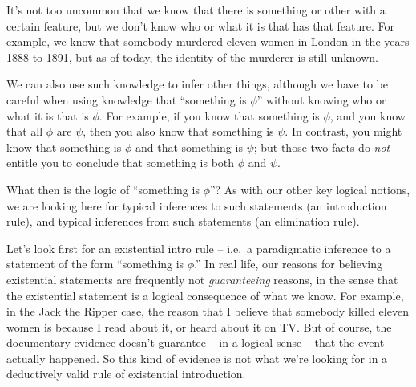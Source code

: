 It's not too uncommon that we know that there is something or other
with a certain feature, but we don't know who or what it is that has
that feature.  For example, we know that somebody murdered eleven
women in London in the years 1888 to 1891, but as of today, the
identity of the murderer is still unknown.

We can also use such knowledge to infer other things, although we have
to be careful when using knowledge that ``something is $\phi$''
without knowing who or what it is that is $\phi$.  For example, if you
know that something is $\phi$, and you know that all $\phi$ are
$\psi$, then you also know that something is $\psi$.  In contrast, you
might know that something is $\phi$ and that something is $\psi$; but
those two facts do {\it not} entitle you to conclude that something is
both $\phi$ and $\psi$.

What then is the logic of ``something is $\phi$''?  As with our other
key logical notions, we are looking here for typical inferences to
such statements (an introduction rule), and typical inferences
from such statements (an elimination rule).

Let's look first for an existential intro rule -- i.e.\ a paradigmatic
inference to a statement of the form ``something is $\phi$.''  In real
life, our reasons for believing existential statements are frequently
not {\it guaranteeing} reasons, in the sense that the existential
statement is a logical consequence of what we know.  For example, in
the Jack the Ripper case, the reason that I believe that somebody
killed eleven women is because I read about it, or heard about it on
TV.  But of course, the documentary evidence doesn't guarantee -- in a
logical sense -- that the event actually happened.  So this kind of
evidence is not what we're looking for in a deductively valid rule of
existential introduction.

